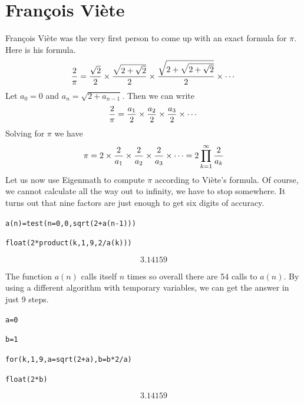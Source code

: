 \documentclass[12pt,openany]{report}
\begin{document}
\section*{Fran\c cois Vi\`ete}
Fran\c cois Vi\`ete was the very first person to come up with an exact formula for $\pi$.
Here is his formula.
\begin{displaymath}
{2\over\pi}={\sqrt2\over2}\times{\sqrt{2+\sqrt2}\over2}\times
{\sqrt{2+\sqrt{2+\sqrt2}}\over2}\times\cdots
\end{displaymath}
Let $a_0=0$ and $a_{n}=\sqrt{2+a_{n-1}}$.
Then we can write
\begin{displaymath}
{2\over\pi}={a_1\over2}\times{a_2\over2}\times
{a_3\over2}\times\cdots
\end{displaymath}
%
Solving for $\pi$ we have
\begin{displaymath}
\pi=2\times{2\over a_1}\times{2\over a_2}\times{2\over a_3}\times\cdots=2\prod_{k=1}^\infty
{2\over a_k}
\end{displaymath}
%
Let us now use Eigenmath to compute $\pi$ according to Vi\`ete's formula.
Of course, we cannot calculate all the way out to infinity, we have to stop somewhere.
It turns out that nine factors are just enough to get six digits of accuracy.

\medskip
{\tt a(n)=test(n=0,0,sqrt(2+a(n-1)))}

{\tt float(2*product(k,1,9,2/a(k)))}

$$3.14159$$

\medskip
\noindent
The function $a(n)$ calls itself $n$ times so overall there are
54 calls to $a(n)$.
By using a different algorithm with temporary variables, we can get the answer in just 9 steps.

\medskip
{\tt a=0}

{\tt b=1}

{\tt for(k,1,9,a=sqrt(2+a),b=b*2/a)}

{\tt float(2*b)}

$$3.14159$$
\end{document}

